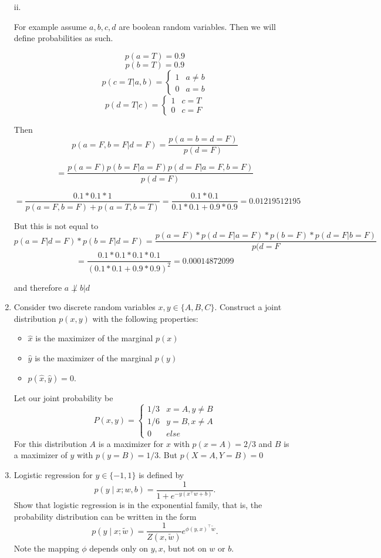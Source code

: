 \documentclass{article}
\begin{document}
\begin{enumerate}
ii.

For example assume $a, b, c, d$ are boolean random variables. Then we will define probabilities as such.

$$
p(a = T) = 0.9
$$
$$
p(b = T) = 0.9
$$
$$
p(c = T | a, b) = 
\begin{cases} 
1 & a \neq b \\
0 & a = b
\end{cases}
$$
$$
p(d = T | c) = 
\begin{cases}
1 & c = T\\
0 & c = F
\end{cases}
$$

Then 
$$
p(a = F, b =F | d = F) = \frac{p(a = b = d = F)}{p(d=F)}
$$

$$
= \frac{p(a=F) p(b = F | a = F) p(d=F | a= F , b = F)}{p(d=F)}
$$

$$
= \frac{0.1 * 0.1 *1 }{p(a = F, b = F) + p(a = T, b = T)} = \frac{0.1*0.1}{0.1* 0.1 + 0.9*0.9} = 0.01219512195
$$

But this is not equal to 
$$
p(a = F | d = F) *p(b = F | d = F) = \frac{p(a = F) * p(d = F | a = F) * p(b= F)*p(d = F | b = F)}{p(d=F}
$$
$$
=\frac{0.1 * 0.1 * 0.1 * 0.1}{
(0.1 * 0.1 + 0.9*0.9)^2 
}
= 0.00014872099
$$

and therefore $a \not\perp b | d$


\color{black}

\item
Consider two discrete random variables $x,y \in \{A,B,C\}$.
Construct a joint distribution $p(x,y)$ with the following properties:
\begin{itemize}
\item $\hat x$ is the maximizer of the marginal $p(x)$
\item $\hat y$ is the maximizer of the marginal $p(y)$
\item $p(\hat x, \hat y)=0$.
\end{itemize}
\color{blue}
Let our joint probability be 
$$
P(x,y) = 
\begin{cases}
1/3 & x = A, y \neq B \\
1/6 & y = B, x \neq A \\
0 & else
\end{cases}
$$
For this distribution $A$ is a maximizer for $x$ with $p(x = A) = 2/3$ and $B$ is a maximizer of $y$ with $p(y = B) = 1/3$. 
But $p(X = A, Y = B) = 0$
\color{black}

\item
Logistic regression for $y\in \{-1,1\}$ is defined by
$$p(y \mid x; w,b) = \frac{1}{1+e^{-y (x^\top w + b)}}.$$
Show that logistic regression is in the exponential family, that is, the probability distribution can be written in the form
$$p(y \mid x; \tilde w) = \frac{1}{Z(x,\tilde w)} e^{\phi(y,x)^\top \tilde w}.$$
Note the mapping $\phi$ depends only on $y, x$, but not on $w$ or $b$.


\end{enumerate}
\end{document}
